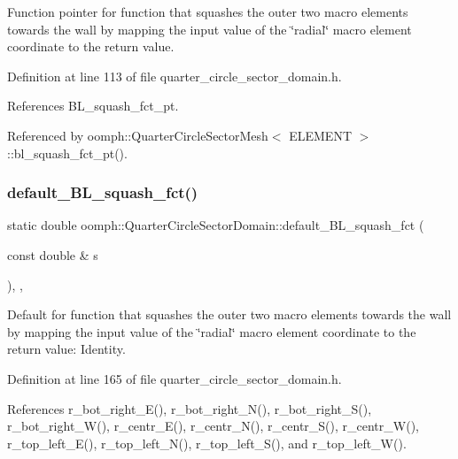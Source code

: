 Function pointer for function that squashes the outer two macro elements towards the wall by mapping the input value of the \char`\"{}radial\char`\"{} macro element coordinate to the return value. 



Definition at line 113 of file quarter\+\_\+circle\+\_\+sector\+\_\+domain.\+h.



References B\+L\+\_\+squash\+\_\+fct\+\_\+pt.



Referenced by oomph\+::\+Quarter\+Circle\+Sector\+Mesh$<$ E\+L\+E\+M\+E\+N\+T $>$\+::bl\+\_\+squash\+\_\+fct\+\_\+pt().

\mbox{\label{classoomph_1_1QuarterCircleSectorDomain_adce1f0c6cf5405d6f8e9e6e0390d8c68}} 
\subsubsection{\texorpdfstring{default\+\_\+\+B\+L\+\_\+squash\+\_\+fct()}{default\_BL\_squash\_fct()}}
{\footnotesize\ttfamily static double oomph\+::\+Quarter\+Circle\+Sector\+Domain\+::default\+\_\+\+B\+L\+\_\+squash\+\_\+fct (\begin{DoxyParamCaption}\item[{const double \&}]{s }\end{DoxyParamCaption})\hspace{0.3cm}{\ttfamily [inline]}, {\ttfamily [static]}, {\ttfamily [private]}}



Default for function that squashes the outer two macro elements towards the wall by mapping the input value of the \char`\"{}radial\char`\"{} macro element coordinate to the return value\+: Identity. 



Definition at line 165 of file quarter\+\_\+circle\+\_\+sector\+\_\+domain.\+h.



References r\+\_\+bot\+\_\+right\+\_\+\+E(), r\+\_\+bot\+\_\+right\+\_\+\+N(), r\+\_\+bot\+\_\+right\+\_\+\+S(), r\+\_\+bot\+\_\+right\+\_\+\+W(), r\+\_\+centr\+\_\+\+E(), r\+\_\+centr\+\_\+\+N(), r\+\_\+centr\+\_\+\+S(), r\+\_\+centr\+\_\+\+W(), r\+\_\+top\+\_\+left\+\_\+\+E(), r\+\_\+top\+\_\+left\+\_\+\+N(), r\+\_\+top\+\_\+left\+\_\+\+S(), and r\+\_\+top\+\_\+left\+\_\+\+W().


